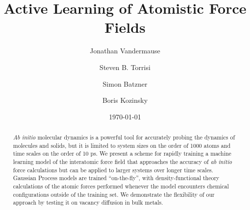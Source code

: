 \documentclass[%
reprint,
superscriptaddress,
amsmath,amssymb,
aps,
prl,
]{revtex4-1}
\begin{document}
\title{Active Learning of Atomistic Force Fields}

\author{Jonathan Vandermause}

\author{Steven B. Torrisi}

\author{Simon Batzner}

\author{Boris Kozinsky}



\date{\today}

\begin{abstract}
\textit{Ab initio} molecular dynamics is a powerful tool for
accurately probing the dynamics of molecules and solids, but it is limited
to system sizes on the order of 1000 atoms and time scales on the order of
10 ps. We present a scheme for rapidly training a machine learning 
model of the interatomic force field that approaches the accuracy of \textit{ab initio} force calculations but can be applied to larger systems over longer time scales. Gaussian Process models are trained “on-the-fly”, with density-functional theory calculations of the atomic forces performed whenever the model encounters chemical configurations outside of the training set. We demonstrate the flexibility of our approach by testing it on vacancy diffusion in bulk metals.
\end{abstract}
\end{document}
